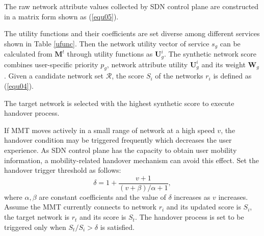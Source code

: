 \documentclass[conference]{IEEEtran}
\begin{document}
The raw  network attribute values collected by SDN control plane are constructed in a matrix form shown as (\ref{equ05}).
		\begin{comment}   
		\label{equ14}
		\boldsymbol{M}^t = {({m_{ij}})_{M \times N}}  ,
		\end{comment}
The utility functions and their coefficients are set diverse among different services shown in Table \ref{ufunc}. 
Then the network utility vector of service $s_g$ can be calculated from $\boldsymbol{M}^t $ through utility functions as $\boldsymbol{U}^i_g$. %
The synthetic network score combines user-specific priority $p_g$, network attribute utility $\boldsymbol{U}_g^i$ and its weight $\boldsymbol{W}_g$.
 Given a candidate network set $\mathcal{R}$, the score $S_i$ of the networks $r_i$ is defined as (\ref{equ04}).
		\begin{comment}   
		\label{equ15}
		{S_i} = \sum_{g = 1}^Y {{p_g}}  \cdot \boldsymbol{W}_g \cdot {\boldsymbol{U}_g^i}^T	.
		\end{comment}
The target network is selected with the highest synthetic score to execute handover process. 

If MMT moves actively in a small range of network at a high speed $v$, the handover condition may be triggered frequently which decreases the user experience.
 As SDN control plane has the capacity to obtain user mobility information, a mobility-related handover mechanism can avoid this effect. Set the handover trigger threshold as follows:
\begin{equation} 
\label{equ16} 
\delta  = 1 + \frac{v + 1}{{(v + \beta)/\alpha  + 1}} ,
\end{equation}
 where $\alpha,\beta$ are constant coefficients and the value of $\delta$ increases as $v$ increases. Assume the MMT currently connects to network $r_i$ and its updated score is $S_i$, the target network is $r_t$ and its score is $S_t$. The handover process is set to be triggered only when $S_t/S_i > \delta$ is satisfied.
\end{document}

